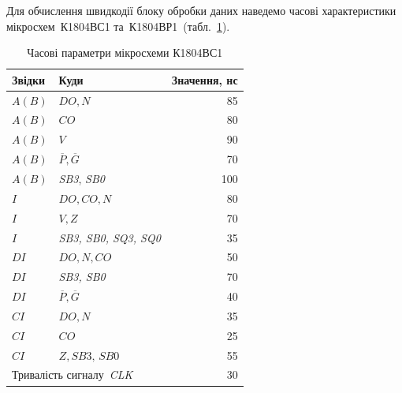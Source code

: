 \documentclass[a4paper,oneside,DIV=12,12pt,headings=normal]{scrartcl}
\newcommand{\schel}[1]{\textit{#1}}
\begin{document}
				Для обчислення швидкодії блоку обробки даних наведемо часові характеристики мікросхем~К1804ВС1 та~К1804ВР1~(табл.~\ref{tab:vs1-time-params}).
				\begin{table}[!htbp]
					\centering
					\begin{tabular}{llr}
						\toprule
							Звідки & Куди & Значення, нс \\
						\midrule
							$A(B)$ & $DO, N$                      & 85 \\
							$A(B)$ & $CO$                         & 80 \\
							$A(B)$ & $V$                          & 90 \\
							$A(B)$ & $\overline{P}, \overline{G}$ & 70 \\
							$A(B)$ & \schel{SB3}, \schel{SB0}     & 100 \\
							$I$    & $DO, CO, N$                  & 80 \\
							$I$    & $V, Z$                       & 70 \\
							$I$    & \schel{SB3, SB0, SQ3, SQ0}   & 35 \\
							$DI$   & $DO, N, CO$                  & 50 \\
							$DI$   & \schel{SB3, SB0}             & 70 \\
							$DI$   & $\overline{P}, \overline{G}$ & 40 \\
							$CI$   & $DO, N$                      & 35 \\
							$CI$   & $CO$                         & 25 \\
							$CI$   & $Z, \schel{SB3, SB0}$        & 55 \\
							\multicolumn{2}{l}{Тривалість сигналу~\schel{CLK}} & 30 \\
						\bottomrule
					\end{tabular}
					\caption{Часові параметри мікросхеми К1804ВС1}
					\label{tab:vs1-time-params}
				\end{table}
\end{document}
